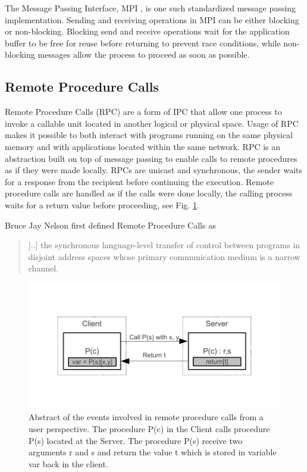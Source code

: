 The Message Passing Interface, MPI \cite{mpi3stand}, is one such standardized message passing implementation. Sending and receiving operations in MPI can be either blocking or non-blocking. Blocking send and receive operations wait for the application buffer to be free for reuse before returning to prevent race conditions, while non-blocking messages allow the process to proceed as soon as possible.

\subsection{Remote Procedure Calls}
Remote Procedure Calls (RPC) are a form of IPC that allow one process to invoke a callable unit \cite{Eac} located in another logical or physical space. Usage of RPC makes it possible to both interact with programs running on the same physical memory and with applications located within the same network. RPC is an abstraction built on top of message passing to enable calls to remote procedures as if they were made locally.
RPCs are unicast and synchronous, the sender waits for a response from the recipient before continuing the execution. Remote procedure calls are handled as if the calls were done locally, the calling process waits for a return value before proceeding, see Fig. \ref{rpc}.

Bruce Jay Nelson first defined Remote Procedure Calls as
\begin{quotation}
[..] the synchronous language-level transfer of control between programs in disjoint address spaces whose primary communication medium is a narrow channel.  \cite{Nelson:1981:RPC:910306}
\end{quotation}

\begin{figure}[t]
		\centering	\includegraphics{part_2/remote_procedure_calls/rpc.pdf}
		\caption{Abstract of the events involved in remote procedure calls from a user perspective.
The procedure P(c) in the Client calls procedure P(s) located at the Server. The procedure P(s) receive two arguments r and s and return the value t which is stored in variable var back in the client.}
		\label{rpc} 
\end{figure}

